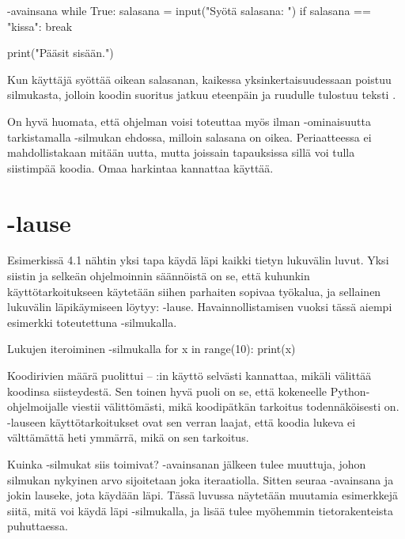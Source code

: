 \begin{example}{-avainsana}
while True:
	salasana = input("Syötä salasana: ")
	if salasana == "kissa":
		break

print("Pääsit sisään.")
\end{example}

Kun käyttäjä syöttää oikean salasanan, kaikessa yksinkertaisuudessaan  poistuu silmukasta, jolloin koodin suoritus jatkuu eteenpäin ja ruudulle tulostuu teksti .

On hyvä huomata, että ohjelman voisi toteuttaa myös ilman -ominaisuutta tarkistamalla -silmukan ehdossa, milloin salasana on oikea. Periaatteessa  ei mahdollistakaan mitään uutta, mutta joissain tapauksissa sillä voi tulla siistimpää koodia. Omaa harkintaa kannattaa käyttää.

\section{-lause}

Esimerkissä 4.1 nähtin yksi tapa käydä läpi kaikki tietyn lukuvälin luvut. Yksi siistin ja selkeän ohjelmoinnin säännöistä on se, että kuhunkin käyttötarkoitukseen käytetään siihen parhaiten sopivaa työkalua, ja sellainen lukuvälin läpikäymiseen löytyy: -lause. Havainnollistamisen vuoksi tässä aiempi esimerkki toteutettuna -silmukalla.

\begin{example}{Lukujen iteroiminen -silmukalla}
for x in range(10):
	print(x)
\end{example}

Koodirivien määrä puolittui – :in käyttö selvästi kannattaa, mikäli välittää koodinsa siisteydestä. Sen toinen hyvä puoli on se, että kokeneelle Python-ohjelmoijalle  viestii välittömästi, mikä koodipätkän tarkoitus todennäköisesti on. -lauseen käyttötarkoitukset ovat sen verran laajat, että koodia lukeva ei välttämättä heti ymmärrä, mikä on sen tarkoitus.

Kuinka -silmukat siis toimivat? -avainsanan jälkeen tulee muuttuja, johon silmukan nykyinen arvo sijoitetaan joka iteraatiolla. Sitten seuraa -avainsana ja jokin lauseke, jota käydään läpi. Tässä luvussa näytetään muutamia esimerkkejä siitä, mitä voi käydä läpi -silmukalla, ja lisää tulee myöhemmin tietorakenteista puhuttaessa.

